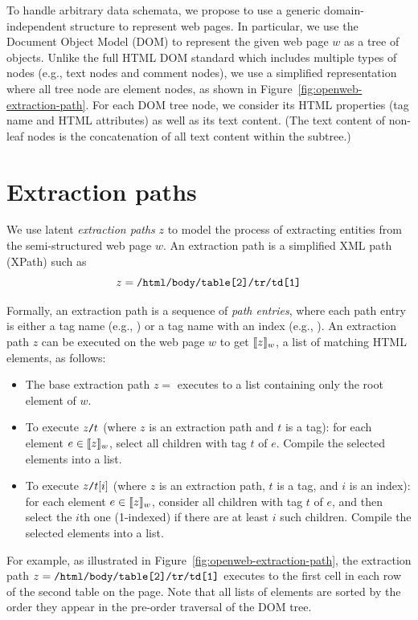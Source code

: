To handle arbitrary data schemata,
we propose to use a generic domain-independent structure
to represent web pages.
In particular,
we use the Document Object Model (DOM)
to represent the given web page $w$
as a tree of objects.
Unlike the full HTML DOM standard which includes multiple types of nodes
(e.g., text nodes and comment nodes),
we use a simplified representation
where all tree node are element nodes,
as shown in Figure~\ref{fig:openweb-extraction-path}.
For each DOM tree node,
we consider its HTML properties
(tag name and HTML attributes)
as well as its text content.
(The text content of non-leaf nodes
is the concatenation of all text content
within the subtree.)


\section{Extraction paths}\label{sec:extraction-paths}

We use latent \emph{extraction paths} $z$
to model the process of extracting entities
from the semi-structured web page $w$.
An extraction path is a simplified XML path (XPath) such as
\begin{equation}
z = \texttt{/html/body/table[2]/tr/td[1]}
\label{eqn:ex-xpath}
\end{equation}

Formally, an extraction path is a sequence of
\emph{path entries},
where each path entry is either a tag name (e.g., )
or a tag name with an index (e.g., ).
An extraction path $z$ can be executed on
the web page $w$ to get
$\llbracket{z}\rrbracket_{w}$,
a list of matching HTML elements,
as follows:
\begin{itemize}
\item 
The base extraction path $z =$ 
executes to a list containing
only the root  element of $w$.
\item
To execute $z\texttt{/}t$
(where $z$ is an extraction path and $t$ is a tag):
for each element $e \in \llbracket{z}\rrbracket_{w}$,
select all children with tag $t$ of $e$.
Compile the selected elements into a list.
\item
To execute $z\texttt{/}t[i]$
(where $z$ is an extraction path, $t$ is a tag, and $i$ is an index):
for each element $e \in \llbracket{z}\rrbracket_{w}$,
consider all children with tag $t$ of $e$,
and then select the $i$th one (1-indexed)
if there are at least $i$ such children.
Compile the selected elements into a list.
\end{itemize}

For example, as illustrated in
Figure~\ref{fig:openweb-extraction-path},
the extraction path
$z = \texttt{/html/body/table[2]/tr/td[1]}$
executes to the
first cell in each row of the second table on the page.
Note that all lists of elements are sorted
by the order they appear in the pre-order traversal
of the DOM tree.


